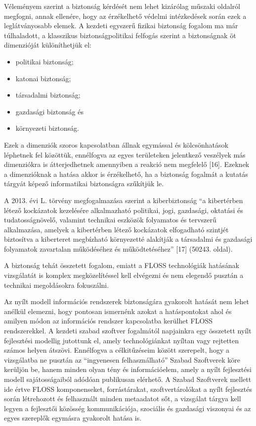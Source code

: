 \documentclass[12pt,magyar,a4paper,oneside]{scrreprt}
\providecommand{\tightlist}{%
  \setlength{\itemsep}{0pt}\setlength{\parskip}{0pt}}
\begin{document}
Véleményem szerint a biztonság kérdését nem lehet kizárólag műszaki
oldalról megfogni, annak ellenére, hogy az érzékelhető védelmi
intézkedések során ezek a leglátványosabb elemek. A kezdeti egyszerű
fizikai biztonság fogalom ma már túlhaladott, a klasszikus
biztonságpolitikai felfogás szerint a biztonságnak öt dimenzióját
különíthetjük el:

\begin{itemize}
\tightlist
\item
  politikai biztonság;
\item
  katonai biztonság;
\item
  társadalmi biztonság;
\item
  gazdasági biztonság és
\item
  környezeti biztonság.
\end{itemize}

Ezek a dimenziók szoros kapcsolatban állnak egymással és kölcsönhatások
léphetnek fel közöttük, ennélfogva az egyes területeken jelentkező
veszélyek más dimenziókra is átterjedhetnek amennyiben a reakció nem
megfelelő {[}16{]}. Ezeknek a dimenzióknak a hatása akkor is
érzékelhető, ha a biztonság fogalmát a kutatás tárgyát képező
informatikai biztonságra szűkítjük le.

A 2013. évi L. törvény megfogalmazása szerint a kiberbiztonság ``a
kibertérben létező kockázatok kezelésére alkalmazható politikai, jogi,
gazdasági, oktatási és tudatosságnövelő, valamint technikai eszközök
folyamatos és tervszerű alkalmazása, amelyek a kibertérben létező
kockázatok elfogadható szintjét biztosítva a kiberteret megbízható
környezetté alakítják a társadalmi és gazdasági folyamatok zavartalan
működéséhez és működtetéséhez'' {[}17{]} (50243. oldal).

A biztonság tehát összetett fogalom, emiatt a FLOSS technológiák
hatásának vizsgálatát is komplex megközelítéssel kell elvégezni és nem
elegendő pusztán a technikai megoldásokra fokuszálni.

Az nyílt modell információs rendszerek biztonságára gyakorolt hatását
nem lehet anélkül elemezni, hogy pontosan ismernénk azokat a
hatáspontokat ahol és amilyen módon az információs rendszer kapcsolatba
kerülhet FLOSS rendszerekkel. A kezdeti szabad szoftver fogalmától
napjainkra egy összetett nyílt fejlesztési modellig jutottunk el, amely
technológiánkat nyíltan vagy rejtetten számos helyen átszövi. Ennélfogva
a célkitűzéseim között szerepelt, hogy a vizsgálatba ne pusztán az
``ingyenesen felhasználható'' Szabad Szoftverek köre kerüljön be, hanem
minden olyan tény és információelem, amely a nyílt fejlesztési modell
sajátosságaiból adódóan publikusan elérhető. A Szabad Szoftverek mellett
ide értve FLOSS komponenseket, forrástárakat, szoftvertárolókat a nyílt
fejlesztés során létrehozott és felhasznált minden metaadatot sőt, a
vizsgálat tárgya kell legyen a fejlesztői közösség kommunikációja,
szociális és gazdasági viszonyai és az egyes szereplők egymásra
gyakorolt hatása is.
\end{document}
